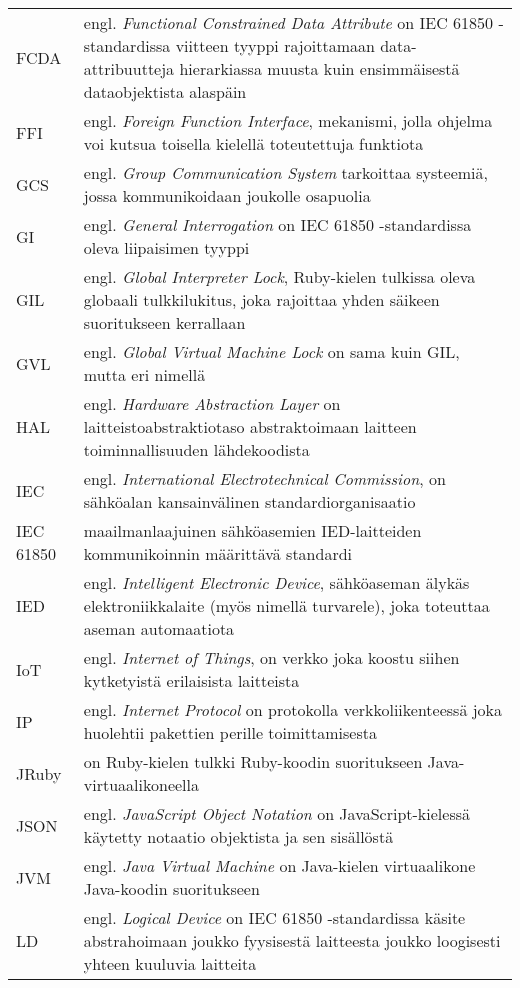 \begin{tabularx}{\linewidth}[h]{@{} p{} p{} @{}}
	FCDA & engl. \emph{Functional Constrained Data Attribute} on IEC 61850 -standardissa viitteen tyyppi rajoittamaan data-attribuutteja hierarkiassa muusta kuin ensimmäisestä dataobjektista alaspäin \\
	FFI & engl. \emph{Foreign Function Interface}, mekanismi, jolla ohjelma voi kutsua toisella kielellä toteutettuja funktiota \\
	GCS & engl. \emph{Group Communication System} tarkoittaa systeemiä, jossa kommunikoidaan joukolle osapuolia \\
	GI & engl. \emph{General Interrogation} on IEC 61850 -standardissa oleva liipaisimen tyyppi \\
	GIL & engl. \emph{Global Interpreter Lock}, Ruby-kielen tulkissa oleva globaali tulkkilukitus, joka rajoittaa yhden säikeen suoritukseen kerrallaan \\
	GVL & engl. \emph{Global Virtual Machine Lock} on sama kuin GIL, mutta eri nimellä \\
	HAL & engl. \emph{Hardware Abstraction Layer} on laitteistoabstraktiotaso abstraktoimaan laitteen toiminnallisuuden lähdekoodista \\
	IEC & engl. \emph{International Electrotechnical Commission}, on sähköalan kansainvälinen standardiorganisaatio \\
	IEC 61850 & maailmanlaajuinen sähköasemien IED-laitteiden kommunikoinnin määrittävä standardi \\
	IED & engl. \emph{Intelligent Electronic Device}, sähköaseman älykäs elektroniikkalaite (myös nimellä turvarele), joka toteuttaa aseman automaatiota \\
	IoT & engl. \emph{Internet of Things}, on verkko joka koostu siihen kytketyistä erilaisista laitteista \\
	IP & engl. \emph{Internet Protocol} on protokolla verkkoliikenteessä joka huolehtii pakettien perille toimittamisesta \\
	JRuby & on Ruby-kielen tulkki Ruby-koodin suoritukseen Java-virtuaalikoneella \\
	JSON & engl. \emph{JavaScript Object Notation} on JavaScript-kielessä käytetty notaatio objektista ja sen sisällöstä \\
	JVM & engl. \emph{Java Virtual Machine} on Java-kielen virtuaalikone Java-koodin suoritukseen \\
	LD & engl. \emph{Logical Device} on IEC 61850 -standardissa käsite abstrahoimaan joukko fyysisestä laitteesta joukko loogisesti yhteen kuuluvia laitteita \\

\end{tabularx}
